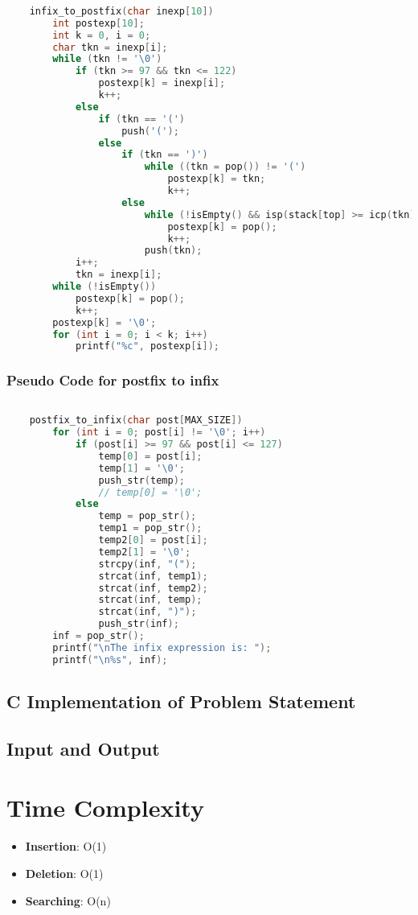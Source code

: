 \documentclass[11pt]{article}
\begin{document}
\begin{lstlisting}[language=C]
	
	infix_to_postfix(char inexp[10])
		int postexp[10];
		int k = 0, i = 0;
		char tkn = inexp[i];
		while (tkn != '\0')
			if (tkn >= 97 && tkn <= 122)
				postexp[k] = inexp[i];
				k++;
			else
				if (tkn == '(')
					push('(');
				else
					if (tkn == ')')
						while ((tkn = pop()) != '(')
							postexp[k] = tkn;
							k++;
					else
						while (!isEmpty() && isp(stack[top] >= icp(tkn)))
							postexp[k] = pop();
							k++;
						push(tkn);
			i++;
			tkn = inexp[i];
		while (!isEmpty())
			postexp[k] = pop();
			k++;
		postexp[k] = '\0';
		for (int i = 0; i < k; i++)
			printf("%c", postexp[i]);
\end{lstlisting}\subsubsection{Pseudo Code for postfix to infix}

\begin{lstlisting}[language=C]
	
	postfix_to_infix(char post[MAX_SIZE])
		for (int i = 0; post[i] != '\0'; i++)
			if (post[i] >= 97 && post[i] <= 127)
				temp[0] = post[i];
				temp[1] = '\0';
				push_str(temp);
				// temp[0] = '\0';
			else
				temp = pop_str();
				temp1 = pop_str();
				temp2[0] = post[i];
				temp2[1] = '\0';
				strcpy(inf, "(");
				strcat(inf, temp1);
				strcat(inf, temp2);
				strcat(inf, temp);
				strcat(inf, ")");
				push_str(inf);
		inf = pop_str();
		printf("\nThe infix expression is: ");
		printf("\n%s", inf);
\end{lstlisting}
\subsection{C Implementation of Problem Statement}



\subsection{Input and Output}


\section{Time Complexity}
\begin{itemize}
	\item \textbf{Insertion}: O(1)
	\item \textbf{Deletion}: O(1)
	\item \textbf{Searching}: O(n)
\end{itemize}
\end{document}
